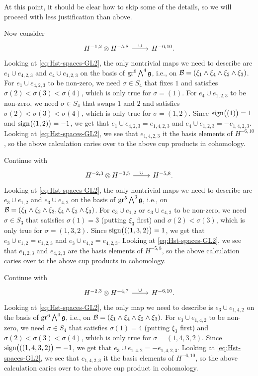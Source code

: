 At this point, it should be clear how to skip some of the details, so we will proceed with less justification than above.

Now consider
\[
  \begin{tikzcd}
    H^{-1,2} \otimes H^{-5,8} \ar[r,"\cup"] & H^{-6,10}.
  \end{tikzcd}
\]
Looking at \eqref{eq:Hst-spaces-GL2}, the only nontrivial maps we need to describe are $e_{1} \cup e_{4,2,3}$ and $e_{4} \cup e_{1,2,3}$ on the basis of $\operatorname{gr}^{6} \bigwedge^{4}\mathfrak{g}$, i.e., on $\mathcal{B} = (\xi_{1} \wedge \xi_{4} \wedge \xi_{2} \wedge \xi_{3})$. For $e_{1} \cup e_{4,2,3}$ to be non-zero, we need $\sigma \in S_{4}$ that fixes $1$ and satisfies $\sigma(2) < \sigma(3) < \sigma(4)$, which is only true for $\sigma = (1)$. For $e_{4} \cup e_{1,2,3}$ to be non-zero, we need $\sigma \in S_{4}$ that swaps $1$ and $2$ and satisfies $\sigma(2) < \sigma(3) < \sigma(4)$, which is only true for $\sigma = (1,2)$. Since $\operatorname{sign}\bigl((1)\bigr) = 1$ and $\operatorname{sign}\bigl((1,2)\bigr) = -1$, we get that $e_{1} \cup e_{4,2,3} = e_{1,4,2,3}$ and $e_{4} \cup e_{1,2,3} = -e_{1,4,2,3}$. Looking at \eqref{eq:Hst-spaces-GL2}, we see that $e_{1,4,2,3}$ it the basis elements of $H^{-6,10}$, so the above calculation caries over to the above cup products in cohomology.

Continue with
\[
  \begin{tikzcd}
    H^{-2,3} \otimes H^{-3,5} \ar[r,"\cup"] & H^{-5,8}.
  \end{tikzcd}
\]
Looking at \eqref{eq:Hst-spaces-GL2}, the only nontrivial maps we need to describe are $e_{3} \cup e_{1,2}$ and $e_{3} \cup e_{4,2}$ on the basis of $\operatorname{gr}^{5} \bigwedge^{3}\mathfrak{g}$, i.e., on $\mathcal{B} = (\xi_{1} \wedge \xi_{2} \wedge \xi_{3}, \xi_{4} \wedge \xi_{2} \wedge \xi_{3})$.  For $e_{3} \cup e_{1,2}$ or $e_{3} \cup e_{4,2}$ to be non-zero, we need $\sigma \in S_{3}$ that satisfies $\sigma(1) = 3$ (putting $\xi_{3}$ first) and $\sigma(2) < \sigma(3)$, which is only true for $\sigma = (1,3,2)$. Since $\operatorname{sign}\bigl(((1,3,2)\bigr) = 1$, we get that $e_{3} \cup e_{1,2} = e_{1,2,3}$ and $e_{3} \cup e_{4,2} = e_{4,2,3}$. Looking at \eqref{eq:Hst-spaces-GL2}, we see that $e_{1,2,3}$ and $e_{4,2,3}$ are the basis elements of $H^{-5,8}$, so the above calculation caries over to the above cup products in cohomology.

Continue with
\[
  \begin{tikzcd}
    H^{-2,3} \otimes H^{-4,7} \ar[r,"\cup"] & H^{-6,10}.
  \end{tikzcd}
\]
Looking at \eqref{eq:Hst-spaces-GL2}, the only map we need to describe is $e_{3} \cup e_{1,4,2}$ on the basis of $\operatorname{gr}^{6} \bigwedge^{4}\mathfrak{g}$, i.e., on $\mathcal{B} = (\xi_{1} \wedge \xi_{4} \wedge \xi_{2} \wedge \xi_{3})$.  For $e_{3} \cup e_{1,4,2}$ to be non-zero, we need $\sigma \in S_{4}$ that satisfies $\sigma(1) = 4$ (putting $\xi_{3}$ first) and $\sigma(2) < \sigma(3) < \sigma(4)$, which is only true for $\sigma = (1,4,3,2)$. Since $\operatorname{sign}\bigl(((1,4,3,2)\bigr) = -1$, we get that $e_{3} \cup e_{1,4,2} = -e_{1,4,2,3}$. Looking at \eqref{eq:Hst-spaces-GL2}, we see that $e_{1,4,2,3}$ it the basis elements of $H^{-6,10}$, so the above calculation caries over to the above cup product in cohomology.

